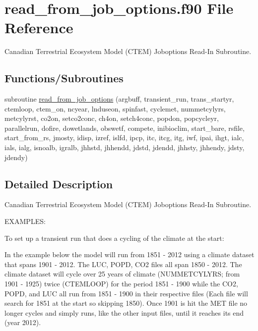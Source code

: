 \hypertarget{read__from__job__options_8f90}{}\section{read\+\_\+from\+\_\+job\+\_\+options.\+f90 File Reference}
\label{read__from__job__options_8f90}


Canadian Terrestrial Ecosystem Model (C\+T\+E\+M) Joboptions Read-\/\+In Subroutine.  


\subsection*{Functions/\+Subroutines}
\begin{DoxyCompactItemize}
\item 
subroutine \hyperlink{read__from__job__options_8f90_a59635532072b59aa5db6bd717cebb79b}{read\+\_\+from\+\_\+job\+\_\+options} (argbuff, transient\+\_\+run, trans\+\_\+startyr, ctemloop, ctem\+\_\+on, ncyear, lnduseon, spinfast, cyclemet, nummetcylyrs, metcylyrst, co2on, setco2conc, ch4on, setch4conc, popdon, popcycleyr, parallelrun, dofire, dowetlands, obswetf, compete, inibioclim, start\+\_\+bare, rsfile, start\+\_\+from\+\_\+rs, jmosty, idisp, izref, islfd, ipcp, itc, itcg, itg, iwf, ipai, ihgt, ialc, ials, ialg, isnoalb, igralb, jhhstd, jhhendd, jdstd, jdendd, jhhsty, jhhendy, jdsty, jdendy)
\end{DoxyCompactItemize}


\subsection{Detailed Description}
Canadian Terrestrial Ecosystem Model (C\+T\+E\+M) Joboptions Read-\/\+In Subroutine. 

E\+X\+A\+M\+P\+L\+E\+S\+:

To set up a transient run that does a cycling of the climate at the start\+:

In the example below the model will run from 1851 -\/ 2012 using a climate dataset that spans 1901 -\/ 2012. The L\+U\+C, P\+O\+P\+D, C\+O2 files all span 1850 -\/ 2012. The climate dataset will cycle over 25 years of climate (N\+U\+M\+M\+E\+T\+C\+Y\+L\+Y\+R\+S; from 1901 -\/ 1925) twice (C\+T\+E\+M\+L\+O\+O\+P) for the period 1851 -\/ 1900 while the C\+O2, P\+O\+P\+D, and L\+U\+C all run from 1851 -\/ 1900 in their respective files (Each file will search for 1851 at the start so skipping 1850). Once 1901 is hit the M\+E\+T file no longer cycles and simply runs, like the other input files, until it reaches its end (year 2012).

